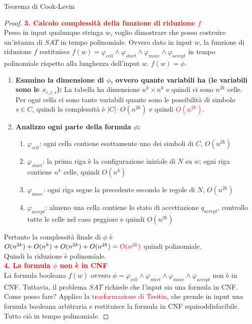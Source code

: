 \documentclass{article}  %
\theoremstyle{definition}
\begin{document}
\begin{theorem}{Teorema di Cook-Levin}
\begin{proof}
		\textcolor{red}{\textbf{3. Calcolo complessità della funzione di riduzione $f$}} \\
		Preso in input qualunque stringa $w$, voglio dimostrare che posso costruire un'istanza di $SAT$ in tempo polinomiale.
		Ovvero dato in input $w$, la funzione di riduzione $f$ restituisce $f(w)=\varphi_{cell} \land \varphi_{start} \land \varphi_{move} \land \varphi_{accept}$
		in tempo polinomiale rispetto alla lunghezza dell'input $w$. $f(w)=\phi$.
		\begin{enumerate}
			\item \textbf{Esamino la dimensione di $\phi$, ovvero quante variabili ha (le variabili sono le $x_{i,j,s}$):}
			      La tabella ha dimensione $n^k \times n^k$ e quindi ci sono $n^{2k}$ celle. Per ogni cella ci sono tante variabili quante sono le possibilità
			      di simbolo $s \in C$, quindi la complessità è $|C|\cdot O(n^{2k})$ e quindi \textcolor{red}{$O(n^{2k})$}.
			\item \textbf{Analizzo ogni parte della formula $\phi$:}
			      \begin{enumerate}
				      \item $\varphi_{cell}$: ogni cella contiene esattamente uno dei simboli di $C$, $O(n^{2k})$
				      \item $\varphi_{start}$: la prima riga è la configurazione iniziale di $N$ su $w$; ogni riga contiene $n^k$ celle, quindi $O(n^k)$
				      \item $\varphi_{move}$: ogni riga segue la precedente secondo le regole di $N$, $O(n^{2k})$
				      \item $\varphi_{accept}$: almeno una cella contiene lo stato di accettazione $q_{accept}$, controllo tutte le celle nel caso peggiore e quindi $O(n^{2k})$
			      \end{enumerate}
		\end{enumerate}
		Pertanto la complessità finale di $\phi$ è $O(n^{2k})+O(n^{k})+O(n^{2k})+O(n^{2k})=\textcolor{red}{O(n^{2k})}$ quindi polinomiale.\\
		Quindi la riduzione è polinomiale. \\

		\textcolor{red}{\textbf{4. La formula $\phi$ non è in CNF}} \\
		La formula booleana $f(w)$ ovvero $\phi = \varphi_{cell} \land \varphi_{start} \land \varphi_{move} \land \varphi_{accept}$ non è in CNF.
		Tuttavia, il problema $SAT$ richiede che l'input sia una formula in CNF. Come posso fare?
		Applico la \textcolor{red}{trasformazione di Tseitin}, che prende in input una formula booleana arbitraria e restituisce la formula in CNF
		equisoddisfacibile. Tutto ciò in tempo polinomiale.


\end{proof}
\end{theorem}
\end{document}
